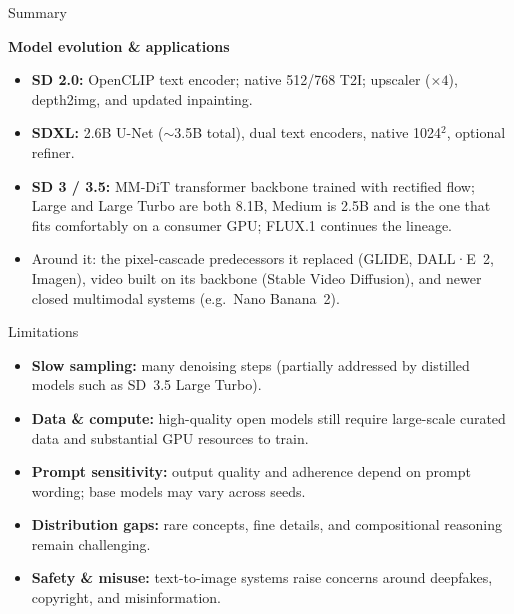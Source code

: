 \begin{frame}[allowframebreaks]{Summary}
  \framebreak

  \textbf{Model evolution \& applications}
  \begin{itemize}\itemsep0.35em
    \item \textbf{SD 2.0:} OpenCLIP text encoder; native 512/768 T2I; upscaler ($\times 4$), depth2img, and updated inpainting.
    \item \textbf{SDXL:} 2.6B U-Net (${\sim}$3.5B total), dual text encoders, native 1024$^2$, optional refiner.
    \item \textbf{SD 3 / 3.5:} MM-DiT transformer backbone trained with rectified flow; Large and Large Turbo are both 8.1B, Medium is 2.5B and is the one that fits comfortably on a consumer GPU; FLUX.1 continues the lineage.
    \item Around it: the pixel-cascade predecessors it replaced (GLIDE, DALL·E~2, Imagen), video built on its backbone (Stable Video Diffusion), and newer closed multimodal systems (e.g.\ Nano Banana~2).
  \end{itemize}
\end{frame}

\begin{frame}{Limitations}
  \begin{itemize}\itemsep0.35em
    \item \textbf{Slow sampling:} many denoising steps (partially addressed by distilled models such as SD~3.5 Large Turbo).
    \item \textbf{Data \& compute:} high-quality open models still require large-scale curated data and substantial GPU resources to train.
    \item \textbf{Prompt sensitivity:} output quality and adherence depend on prompt wording; base models may vary across seeds.
    \item \textbf{Distribution gaps:} rare concepts, fine details, and compositional reasoning remain challenging.
    \item \textbf{Safety \& misuse:} text-to-image systems raise concerns around deepfakes, copyright, and misinformation.
  \end{itemize}
\end{frame}
